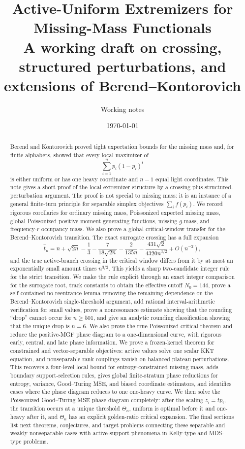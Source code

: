 \documentclass[11pt]{article}
\title{Active-Uniform Extremizers for Missing-Mass Functionals\\
\large A working draft on crossing, structured perturbations, and extensions of Berend--Kontorovich}
\author{Working notes}
\date{\today}
\theoremstyle{definition}
\begin{document}
\maketitle

\begin{abstract}
Berend and Kontorovich proved tight expectation bounds for the missing mass and, for finite alphabets, showed that every local maximizer of
\[
  \sum_{i=1}^n p_i(1-p_i)^t
\]
is either uniform or has one heavy coordinate and $n-1$ equal light coordinates. This note gives a short proof of the local extremizer structure by a crossing plus structured-perturbation argument. The proof is not special to missing mass: it is an instance of a general finite-turn principle for separable simplex objectives $\sum_i f(p_i)$. We record rigorous corollaries for ordinary missing mass, Poissonized expected missing mass, global Poissonized positive moment generating functions, missing $g$-mass, and frequency-$r$ occupancy mass. We also prove a global critical-window transfer for the Berend--Kontorovich transition. The exact surrogate crossing has a full expansion
\[
  \widehat t_n = n+\sqrt{2n}-\frac13-\frac{7}{18\sqrt{2n}}-\frac{2}{135n}
       -\frac{431\sqrt2}{4320n^{3/2}}+O(n^{-2}),
\]
and the true active-branch crossing in the critical window differs from it by at most an exponentially small amount times $n^{3/2}$. This yields a sharp two-candidate integer rule for the strict transition. We make the rule explicit through an exact integer comparison for the surrogate root, track constants to obtain the effective cutoff $N_0=144$, prove a self-contained no-reentrance lemma removing the remaining dependence on the Berend--Kontorovich single-threshold argument, add rational interval-arithmetic verification for small values, prove a nonresonance estimate showing that the rounding ``drop'' cannot occur for $n\ge501$, and give an analytic rounding classification showing that the unique drop is $n=6$. We also prove the true Poissonized critical theorem and reduce the positive-MGF phase diagram to a one-dimensional curve, with rigorous early, central, and late phase information. We prove a frozen-kernel theorem for constrained and vector-separable objectives: active values solve one scalar KKT equation, and nonseparable rank couplings vanish on balanced plateau perturbations. This recovers a four-level local bound for entropy-constrained missing mass, adds boundary support-selection rules, gives global finite-stratum phase reductions for entropy, variance, Good--Turing MSE, and biased coordinate estimators, and identifies cases where the phase diagram reduces to one one-heavy curve. We then solve the Poissonized Good--Turing MSE phase diagram completely: after the scaling $z_i=t p_i$, the transition occurs at a unique threshold $\Theta_n$, uniform is optimal before it and one-heavy after it, and $\Theta_n$ has an explicit golden-ratio critical expansion. The final sections list next theorems, conjectures, and target problems connecting these separable and weakly nonseparable cases with active-support phenomena in Kelly-type and MDS-type problems.
\end{abstract}
\end{document}
